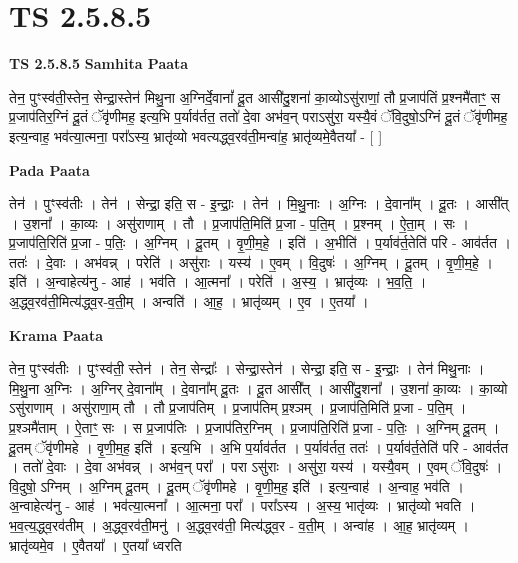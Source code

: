 \documentclass[17pt]{extarticle}
\begin{document}
\section*{ TS 2.5.8.5 }

\textbf{TS 2.5.8.5 } \newline
\textbf{Samhita Paata} \newline

तेन॒ पुꣳस्व॑ती॒स्तेन॒ सेन्द्रा॒स्तेन॑ मिथु॒ना अ॒ग्निर्दे॒वानां᳚ दू॒त आसी॑दु॒शना॑ का॒व्योऽसु॑राणां॒ तौ प्र॒जाप॑तिं प्र॒श्नमै॑ताꣳ॒॒ स प्र॒जाप॑तिर॒ग्निं दू॒तं ॅवृ॑णीमह॒ इत्य॒भि प॒र्याव॑र्तत॒ ततो॑ दे॒वा अभ॑व॒न् पराऽसु॑रा॒ यस्यै॒वं ॅवि॒दुषो॒ऽग्निं दू॒तं ॅवृ॑णीमह॒ इत्य॒न्वाह॒ भव॑त्या॒त्मना॒ परा᳚ऽस्य॒ भ्रातृ॑व्यो भवत्यद्ध्व॒रव॑ती॒मन्वा॑ह॒ भ्रातृ॑व्यमे॒वैतया᳚ - [  ] \newline

\textbf{Pada Paata} \newline

तेन॑ । पुꣳस्व॑तीः । तेन॑ । सेन्द्रा॒ इति॒ स - इ॒न्द्राः॒ । तेन॑ । मि॒थु॒नाः । अ॒ग्निः । दे॒वाना᳚म् । दू॒तः । आसी᳚त् । उ॒शना᳚ । का॒व्यः । असु॑राणाम् । तौ । प्र॒जाप॑ति॒मिति॑ प्र॒जा - प॒ति॒म् । प्र॒श्नम् । ऐ॒ता॒म् । सः । प्र॒जाप॑ति॒रिति॑ प्र॒जा - प॒तिः॒ । अ॒ग्निम् । दू॒तम् । वृ॒णी॒म॒हे॒ । इति॑ । अ॒भीति॑ । प॒र्याव॑र्त॒तेति॑ परि - आव॑र्तत । ततः॑ । दे॒वाः । अभ॑वन्न् । परेति॑ । असु॑राः । यस्य॑ । ए॒वम् । वि॒दुषः॑ । अ॒ग्निम् । दू॒तम् । वृ॒णी॒म॒हे॒ । इति॑ । अ॒न्वाहेत्य॑नु - आह॑ । भव॑ति । आ॒त्मना᳚ । परेति॑ । अ॒स्य॒ । भ्रातृ॑व्यः । भ॒व॒ति॒ । अ॒द्ध्व॒रव॑ती॒मित्य॑द्ध्व॒र-व॒ती॒म् । अन्वति॑ । आ॒ह॒ । भ्रातृ॑व्यम् । ए॒व । ए॒तया᳚ ।  \newline


\textbf{Krama Paata} \newline

तेन॒ पुꣳस्व॑तीः । पुꣳस्व॑ती॒ स्तेन॑ । तेन॒ सेन्द्राः᳚ । सेन्द्रा॒स्तेन॑ । सेन्द्रा॒ इति॒ स - इ॒न्द्राः॒ । तेन॑ मिथु॒नाः । मि॒थु॒ना अ॒ग्निः । अ॒ग्निर् दे॒वाना᳚म् । दे॒वाना᳚म् दू॒तः । दू॒त आसी᳚त् । आसी॑दु॒शना᳚ । उ॒शना॑ का॒व्यः । का॒व्यो ऽसु॑राणाम् । असु॑राणा॒म् तौ । तौ प्र॒जाप॑तिम् । प्र॒जाप॑तिम् प्र॒श्ञम् । प्र॒जाप॑ति॒मिति॑ प्र॒जा - प॒ति॒म् । प्र॒श्ञमै॑ताम् । ऐ॒ताꣳ॒॒ सः । स प्र॒जाप॑तिः । प्र॒जाप॑तिर॒ग्निम् । प्र॒जाप॑ति॒रिति॑ प्र॒जा - प॒तिः॒ । अ॒ग्निम् दू॒तम् । दू॒तम् ॅवृ॑णीमहे । वृ॒णी॒म॒ह॒ इति॑ । इत्य॒भि । अ॒भि प॒र्याव॑र्तत । प॒र्याव॑र्तत॒ ततः॑ । प॒र्याव॑र्त॒तेति॑ परि - आव॑र्तत । ततो॑ दे॒वाः । दे॒वा अभ॑वन्न् । अभ॑व॒न् परा᳚ । परा ऽसु॑राः । असु॑रा॒ यस्य॑ । यस्यै॒वम् । ए॒वम् ॅवि॒दुषः॑ । वि॒दुषो॒ ऽग्निम् । अ॒ग्निम् दू॒तम् । दू॒तम् ॅवृ॑णीमहे । वृ॒णी॒म॒ह॒ इति॑ । इत्य॒न्वाह॑ । अ॒न्वाह॒ भव॑ति । अ॒न्वाहेत्य॑नु - आह॑ । भव॑त्या॒त्मना᳚ । आ॒त्मना॒ परा᳚ । परा᳚ऽस्य । अ॒स्य॒ भातृ॑व्यः । भ्रातृ॑व्यो भवति । भ॒व॒त्य॒द्ध्व॒रव॑तीम् । अ॒द्ध्व॒रव॑ती॒मनु॑ । अ॒द्ध्व॒रव॑ती॒ मित्य॑द्ध्व॒र - व॒ती॒म् । अन्वा॑ह । आ॒ह॒ भ्रातृ॑व्यम् । भ्रातृ॑व्यमे॒व । ए॒वैतया᳚ । ए॒तया᳚ ध्वरति \newline
\end{document}
